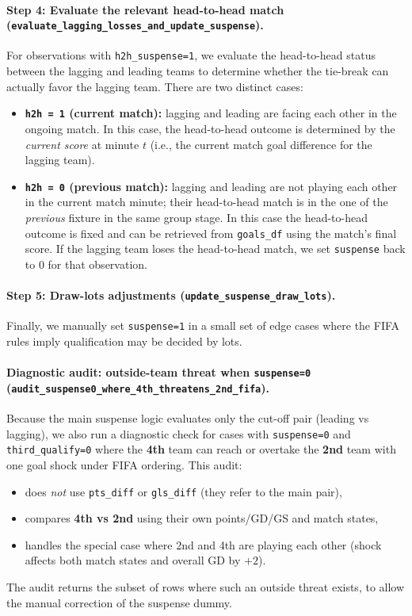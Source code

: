 \documentclass[11pt]{article}
\begin{document}
\paragraph{Step 4: Evaluate the relevant head-to-head match (\texttt{evaluate\_lagging\_losses\_and\_update\_suspense}).}
For observations with \texttt{h2h\_suspense=1}, we evaluate the head-to-head status between the lagging and leading teams to determine whether the tie-break can actually favor the lagging team.
There are two distinct cases:
\begin{itemize}
    \item \textbf{\texttt{h2h = 1} (current match):} lagging and leading are facing each other in the ongoing match. In this case, the head-to-head outcome is determined by the \emph{current score} at minute $t$ (i.e., the current match goal difference for the lagging team).
    \item \textbf{\texttt{h2h = 0} (previous match):} lagging and leading are not playing each other in the current match minute; their head-to-head match is in the one of the \emph{previous} fixture in the same group stage. In this case the head-to-head outcome is fixed and can be retrieved from \texttt{goals\_df} using the match’s final score. If the lagging team loses the head-to-head match, we set \texttt{suspense} back to 0 for that observation.
\end{itemize}
\paragraph{Step 5: Draw-lots adjustments (\texttt{update\_suspense\_draw\_lots}).}
Finally, we manually set \texttt{suspense=1} in a small set of edge cases where the FIFA rules imply qualification may be decided by lots.

\paragraph{Diagnostic audit: outside-team threat when \texttt{suspense=0} (\texttt{audit\_suspense0\_where\_4th\_threatens\_2nd\_fifa}).}
Because the main suspense logic evaluates only the cut-off pair (leading vs lagging), we also run a diagnostic check for cases with \texttt{suspense=0} and \texttt{third\_qualify=0} where the \textbf{4th} team can reach or overtake the \textbf{2nd} team with one goal shock under FIFA ordering. This audit:
\begin{itemize}
    \item does \emph{not} use \texttt{pts\_diff} or \texttt{gls\_diff} (they refer to the main pair),
    \item compares \textbf{4th vs 2nd} using their own points/GD/GS and match states,
    \item handles the special case where 2nd and 4th are playing each other (shock affects both match states and overall GD by $+2$).
\end{itemize}
The audit returns the subset of rows where such an outside threat exists, to allow the manual correction of the suspense dummy.
\end{document}
